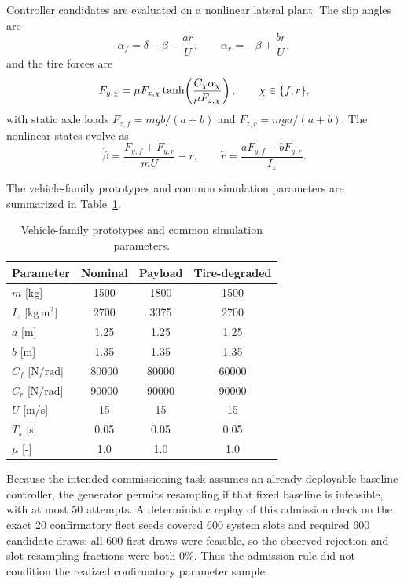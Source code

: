 \documentclass[11pt]{article}
\begin{document}
Controller candidates are evaluated on a nonlinear lateral plant. The slip angles are
\begin{equation}
 \alpha_f=\delta-\beta-\frac{ar}{U},
 \qquad
 \alpha_r=-\beta+\frac{br}{U},
\end{equation}
and the tire forces are
\begin{equation}
 F_{y,\chi}=\mu F_{z,\chi}\tanh\!\left(\frac{C_\chi\alpha_\chi}{\mu F_{z,\chi}}\right),
 \qquad \chi\in\{f,r\},
\end{equation}
with static axle loads $F_{z,f}=mgb/(a+b)$ and $F_{z,r}=mga/(a+b)$. The nonlinear states evolve as
\begin{equation}
 \dot\beta=\frac{F_{y,f}+F_{y,r}}{mU}-r,
 \qquad
 \dot r=\frac{aF_{y,f}-bF_{y,r}}{I_z}.
\end{equation}

The vehicle-family prototypes and common simulation parameters are summarized in Table~\ref{tab:vehicle_prototypes}.
\begin{table}[h]
\centering
\caption{Vehicle-family prototypes and common simulation parameters.}
\label{tab:vehicle_prototypes}
\begin{tabular}{@{}lccc@{}}
\toprule
Parameter & Nominal & Payload & Tire-degraded\\
\midrule
$m$ [kg] & 1500 & 1800 & 1500\\
$I_z$ [$\mathrm{kg\,m^2}$] & 2700 & 3375 & 2700\\
$a$ [m] & 1.25 & 1.25 & 1.25\\
$b$ [m] & 1.35 & 1.35 & 1.35\\
$C_f$ [$\mathrm{N/rad}$] & 80000 & 80000 & 60000\\
$C_r$ [$\mathrm{N/rad}$] & 90000 & 90000 & 90000\\
$U$ [m/s] & 15 & 15 & 15\\
$T_s$ [s] & 0.05 & 0.05 & 0.05\\
$\mu$ [-] & 1.0 & 1.0 & 1.0\\
\bottomrule
\end{tabular}
\end{table}

 Because the intended commissioning task assumes an already-deployable baseline controller, the generator permits resampling if that fixed baseline is infeasible, with at most 50 attempts. A deterministic replay of this admission check on the exact 20 confirmatory fleet seeds covered 600 system slots and required 600 candidate draws: all 600 first draws were feasible, so the observed rejection and slot-resampling fractions were both 0\%. Thus the admission rule did not condition the realized confirmatory parameter sample.
\end{document}
